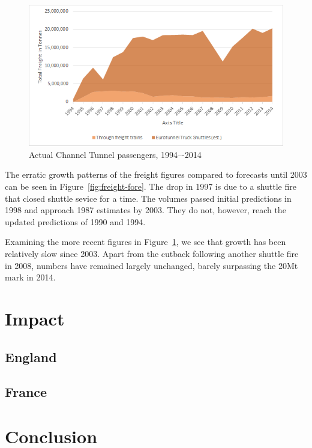 \documentclass[12pt]{article} %
\begin{document}
\begin{figure}[htp]
  \centering
  \includegraphics[width=\textwidth]{freight-new}
  \caption{Actual Channel Tunnel passengers, 1994–-2014}
  \label{fig:freight-new}
\end{figure}

The erratic growth patterns of the freight figures compared to forecasts until 2003 can be seen in Figure~\ref{fig:freight-fore}. The drop in 1997 is due to a shuttle fire that closed shuttle sevice for a time. The volumes passed initial predictions in 1998 and approach 1987 estimates by 2003. They do not, however, reach the updated predictions of 1990 and 1994.

Examining the more recent figures in Figure~\ref{fig:freight-new}, we see that growth has been relatively slow since 2003. Apart from the cutback following another shuttle fire in 2008, numbers have remained largely unchanged, barely surpassing the 20Mt mark in 2014.

\section{Impact}
\subsection{England}
\subsection{France}
\section{Conclusion}
\end{document}
